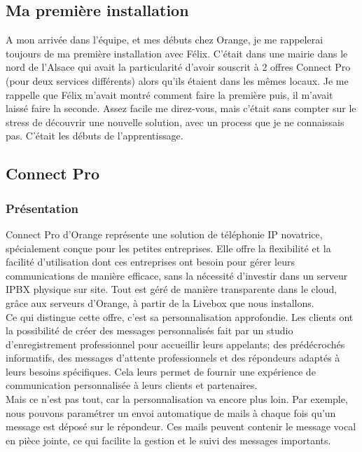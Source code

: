 \documentclass[12pt, a4paper]{article}
\begin{document}
\subsection{Ma première installation}
A mon arrivée dans l'équipe, et mes débuts chez Orange, 
je me rappelerai toujours de ma première installation 
avec Félix. C'était dans une mairie dans le nord
de l'Alsace qui avait la particularité d'avoir 
souscrit à 2 offres Connect Pro (pour deux services différents) 
alors qu'ils étaient dans les mêmes locaux. Je me rappelle que Félix m'avait
montré comment faire la première puis, il m'avait laissé
faire la seconde. Assez facile me direz-vous, mais
c'était sans compter sur le stress de découvrir 
une nouvelle solution, avec un process que je ne connaissais 
pas. C'était les débuts de l'apprentissage. 

\subsection{Connect Pro}
\subsubsection{Présentation}
Connect Pro d'Orange représente une solution
de téléphonie IP novatrice, spécialement conçue pour
les petites entreprises. Elle offre la flexibilité et
la facilité d'utilisation dont ces entreprises ont
besoin pour gérer leurs communications de manière
efficace, sans la nécessité d'investir dans un
serveur IPBX physique sur site. Tout est géré de
manière transparente dans le cloud, grâce aux
serveurs d'Orange, à partir de la Livebox
que nous installons.\\

Ce qui distingue cette offre, c'est sa
personnalisation approfondie. Les clients ont
la possibilité de créer des messages personnalisés 
fait par un studio d'enregistrement professionnel 
pour accueillir leurs appelants; des prédécrochés
informatifs, des messages d'attente professionnels
et des répondeurs adaptés à leurs besoins spécifiques.
Cela leurs permet de fournir une expérience de
communication personnalisée à leurs clients
et partenaires.\\

Mais ce n'est pas tout, car la personnalisation
va encore plus loin. Par exemple, nous
pouvons paramétrer un envoi automatique de
mails à chaque fois qu'un message est déposé sur
le répondeur. Ces mails peuvent contenir le
message vocal en pièce jointe, ce qui
facilite la gestion et le suivi des messages importants.\\
\end{document}
